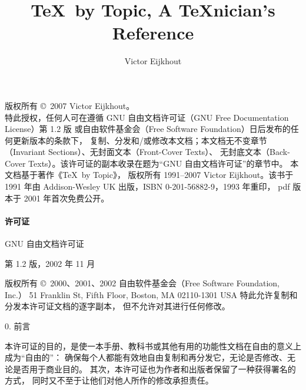 \documentclass[a4paper]{rapport3}
\begin{document}

\let\awp\relax
\let\PopIndentLevel\relax \let\PopListLevel\relax


\def\endofchapter{\vfill\noindent}

\title{\TeX\ by Topic, A \TeX nician's Reference}
\date{}
\author{Victor Eijkhout}
\maketitle
  \begin{minipage}[h]{1.0\linewidth}
  版权所有 \copyright\  2007 Victor Eijkhout。\\
  特此授权，任何人可在遵循 GNU 自由文档许可证（GNU Free Documentation License）第 1.2 版
  或自由软件基金会（Free Software Foundation）日后发布的任何更新版本的条款下，
  复制、分发和/或修改本文档；本文档无不变章节（Invariant Sections）、无封面文本（Front-Cover Texts）、
  无封底文本（Back-Cover Texts）。该许可证的副本收录在题为“GNU
  自由文档许可证”的章节中。
\medskip
本文档基于著作《\TeX\ by Topic》，
版权所有 1991--2007 Victor Eijkhout。该书于
1991 年由 Addison-Wesley UK 出版，ISBN 0-201-56882-9，1993 年重印，
pdf 版本于 2001 年首次免费公开。
  \end{minipage}

\tableofcontents

\pagebreak
{}
\paragraph*{\bf 许可证}
GNU 自由文档许可证

第 1.2 版，2002 年 11 月

  版权所有 \copyright\ 2000、2001、2002  自由软件基金会（Free Software Foundation, Inc.）
  51 Franklin St, Fifth Floor, Boston, MA  02110-1301  USA
  特此允许复制和分发本许可证文档的逐字副本，
  但不允许对其进行任何修改。

0. 前言

本许可证的目的，是使一本手册、教科书或其他有用的功能性文档在自由的意义上成为“自由的”：
确保每个人都能有效地自由复制和再分发它，无论是否修改、无论是否用于商业目的。
其次，本许可证也为作者和出版者保留了一种获得署名的方式，
同时又不至于让他们对他人所作的修改承担责任。
\end{document}
